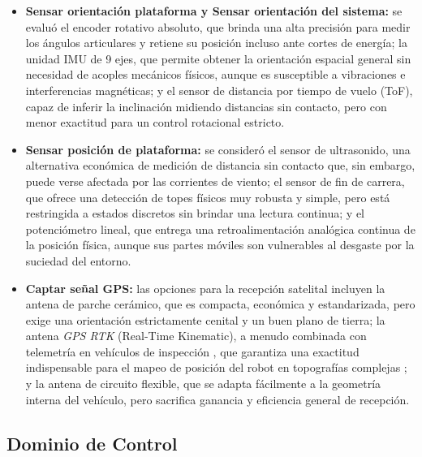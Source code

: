 \documentclass[../../General.tex]{subfiles}
\begin{document}
\begin{itemize}
	\item \textbf{Sensar orientación plataforma y Sensar orientación del sistema:} se evaluó el encoder rotativo absoluto, que brinda una alta precisión para medir los ángulos articulares y retiene su posición incluso ante cortes de energía; la unidad IMU de 9 ejes, que permite obtener la orientación espacial general sin necesidad de acoples mecánicos físicos, aunque es susceptible a vibraciones e interferencias magnéticas; y el sensor de distancia por tiempo de vuelo (ToF), capaz de inferir la inclinación midiendo distancias sin contacto, pero con menor exactitud para un control rotacional estricto.
	
	\item \textbf{Sensar posición de plataforma:} se consideró el sensor de ultrasonido, una alternativa económica de medición de distancia sin contacto que, sin embargo, puede verse afectada por las corrientes de viento; el sensor de fin de carrera, que ofrece una detección de topes físicos muy robusta y simple, pero está restringida a estados discretos sin brindar una lectura continua; y el potenciómetro lineal, que entrega una retroalimentación analógica continua de la posición física, aunque sus partes móviles son vulnerables al desgaste por la suciedad del entorno.
	
	\item \textbf{Captar señal GPS:} las opciones para la recepción satelital incluyen la antena de parche cerámico, que es compacta, económica y estandarizada, pero exige una orientación estrictamente cenital y un buen plano de tierra; la antena \textit{GPS RTK} (Real-Time Kinematic), a menudo combinada con telemetría en vehículos de inspección \citep{CN116405876A}, que garantiza una exactitud indispensable para el mapeo de posición del robot en topografías complejas ; y la antena de circuito flexible, que se adapta fácilmente a la geometría interna del vehículo, pero sacrifica ganancia y eficiencia general de recepción.
	
\end{itemize}
\pagebreak
\subsection{Dominio de Control}
\end{document}
